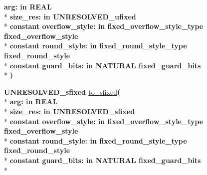 \begin{DoxyCompactItemize}
{\bfseries \textcolor{vhdlchar}{arg\+: }\textcolor{stringliteral}{in }{\bfseries \textcolor{comment}{R\+E\+A\+L}\textcolor{vhdlchar}{ }}}\\*
{\bfseries \textcolor{vhdlchar}{size\+\_\+res\+: }\textcolor{stringliteral}{in }\textcolor{vhdlchar}{U\+N\+R\+E\+S\+O\+L\+V\+E\+D\+\_\+ufixed}}\\*
{\bfseries {\bfseries \textcolor{keywordflow}{constant}\textcolor{vhdlchar}{ }}\textcolor{vhdlchar}{overflow\+\_\+style\+: }\textcolor{stringliteral}{in }\textcolor{vhdlchar}{fixed\+\_\+overflow\+\_\+style\+\_\+type     fixed\+\_\+overflow\+\_\+style}}\\*
{\bfseries {\bfseries \textcolor{keywordflow}{constant}\textcolor{vhdlchar}{ }}\textcolor{vhdlchar}{round\+\_\+style\+: }\textcolor{stringliteral}{in }\textcolor{vhdlchar}{fixed\+\_\+round\+\_\+style\+\_\+type     fixed\+\_\+round\+\_\+style}}\\*
{\bfseries {\bfseries \textcolor{keywordflow}{constant}\textcolor{vhdlchar}{ }}\textcolor{vhdlchar}{guard\+\_\+bits\+: }\textcolor{stringliteral}{in }\textcolor{vhdlchar}{N\+A\+T\+U\+R\+A\+L     fixed\+\_\+guard\+\_\+bits}}\\*
{\bfseries  )} 
\item 
{\bfseries {\bfseries \textcolor{vhdlchar}{U\+N\+R\+E\+S\+O\+L\+V\+E\+D\+\_\+sfixed}\textcolor{vhdlchar}{ }}} \hyperlink{class__fixed__pkg_abbbd2a0b519a9fd9b21058a114a7864c}{to\+\_\+sfixed}{\bfseries  ( }\\*
{\bfseries \textcolor{vhdlchar}{arg\+: }\textcolor{stringliteral}{in }{\bfseries \textcolor{comment}{R\+E\+A\+L}\textcolor{vhdlchar}{ }}}\\*
{\bfseries \textcolor{vhdlchar}{size\+\_\+res\+: }\textcolor{stringliteral}{in }\textcolor{vhdlchar}{U\+N\+R\+E\+S\+O\+L\+V\+E\+D\+\_\+sfixed}}\\*
{\bfseries {\bfseries \textcolor{keywordflow}{constant}\textcolor{vhdlchar}{ }}\textcolor{vhdlchar}{overflow\+\_\+style\+: }\textcolor{stringliteral}{in }\textcolor{vhdlchar}{fixed\+\_\+overflow\+\_\+style\+\_\+type     fixed\+\_\+overflow\+\_\+style}}\\*
{\bfseries {\bfseries \textcolor{keywordflow}{constant}\textcolor{vhdlchar}{ }}\textcolor{vhdlchar}{round\+\_\+style\+: }\textcolor{stringliteral}{in }\textcolor{vhdlchar}{fixed\+\_\+round\+\_\+style\+\_\+type     fixed\+\_\+round\+\_\+style}}\\*
{\bfseries {\bfseries \textcolor{keywordflow}{constant}\textcolor{vhdlchar}{ }}\textcolor{vhdlchar}{guard\+\_\+bits\+: }\textcolor{stringliteral}{in }\textcolor{vhdlchar}{N\+A\+T\+U\+R\+A\+L     fixed\+\_\+guard\+\_\+bits}}\\*

\end{DoxyCompactItemize}
